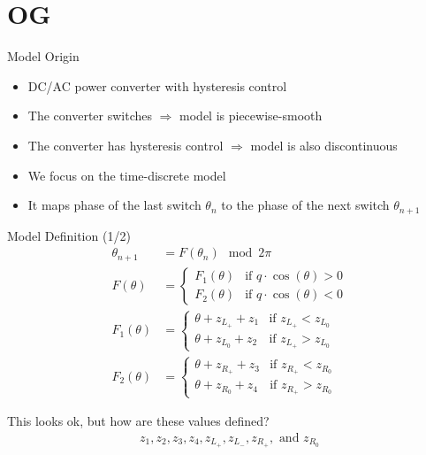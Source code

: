 \section{OG}

\begin{frame}{Model Origin}
	\begin{itemize}
		\item DC/AC power converter with hysteresis control
		\item The converter switches $\Rightarrow$ model is piecewise-smooth
		\item The converter has hysteresis control $\Rightarrow$ model is also discontinuous
		      \pause \vspace{1em}
		\item We focus on the time-discrete model
		\item It maps phase of the last switch $\theta_n$ to the phase of the next switch $\theta_{n+1}$
	\end{itemize}
\end{frame}

\begin{frame}{Model Definition (1/2)}
	\vspace{-2.0em}
	\begin{align*}
		\theta_{n+1} & =  F(\theta_n) \mod 2 \pi
		\\
		F(\theta)    & = \begin{cases}
			                 F_1(\theta) & \text{if } q \cdot \cos(\theta) > 0 \\
			                 F_2(\theta) & \text{if } q \cdot \cos(\theta) < 0
		                 \end{cases}
		\\
		F_1(\theta)  & = \begin{cases}
			                 \theta + z_{L_+} + z_1 & \text{if } z_{L_+} < z_{L_0} \\
			                 \theta + z_{L_0} + z_2 & \text{if } z_{L_+} > z_{L_0}
		                 \end{cases}
		\\
		F_2(\theta)  & = \begin{cases}
			                 \theta + z_{R_+} + z_3 & \text{if } z_{R_+} < z_{R_0} \\
			                 \theta + z_{R_0} + z_4 & \text{if } z_{R_+} > z_{R_0}
		                 \end{cases}
	\end{align*}

	\pause
	\vspace{2em}
	This looks ok, but how are these values defined?
	\begin{align*}
		z_1, z_2, z_3, z_4, z_{L_+}, z_{L_-}, z_{R_+}, \text{ and } z_{R_0}
	\end{align*}
\end{frame}

